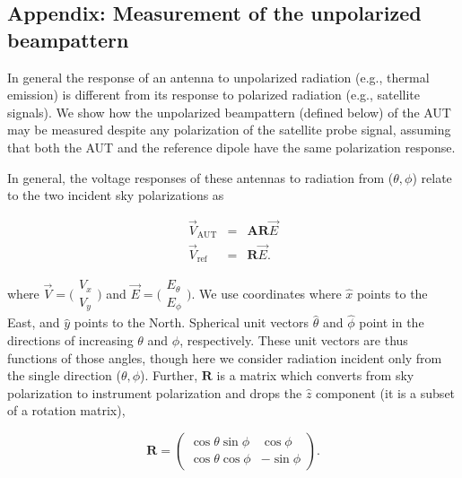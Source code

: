 \begin{subappendices}

\section{Appendix: Measurement of the unpolarized beampattern}
\label{sec:measurementappendix}

In general the response of an antenna to unpolarized radiation (e.g., thermal emission) is different from its response to polarized radiation (e.g., satellite signals). We show how the unpolarized beampattern (defined below) of the AUT may be measured despite any polarization of the satellite probe signal, assuming that both the AUT and the reference dipole have the same polarization response. 

In general, the voltage responses of these antennas to radiation from ($\theta,\phi$) relate to the two incident sky polarizations as

 \begin{eqnarray}
\vec{V}_\mathrm{AUT}&=&\textbf{A}\textbf{R}\vec{E}\label{eqn:measaut} \\
\vec{V}_\mathrm{ref}&=&\textbf{R}\vec{E}\label{eqn:measref}.
\end{eqnarray}

where $\vec{V}=\bigl(\begin{smallmatrix}V_x\\ V_y\end{smallmatrix} \bigr)$ and $\vec{E}=\bigl(\begin{smallmatrix}E_\theta \\ E_\phi\end{smallmatrix} \bigr)$. We use coordinates where $\hat{x}$ points to the East, and $\hat{y}$ points to the North. Spherical unit vectors $\hat{\theta}$ and $\hat{\phi}$ point in the directions of increasing $\theta$ and $\phi$, respectively. These unit vectors are thus functions of those angles, though here we consider radiation incident only from the single direction ($\theta,\phi$). Further, $\textbf{R}$ is a matrix which converts from sky polarization to instrument polarization and drops the $\hat{z}$ component (it is a subset of a rotation matrix),

\begin{equation}
\label{eqn:rotmat}
\textbf{R}=\left(\begin{array}{ccc}
\cos\theta\sin\phi & \cos\phi\\
\cos\theta\cos\phi & -\sin\phi
\end{array}\right).
\end{equation}



\end{subappendices}
